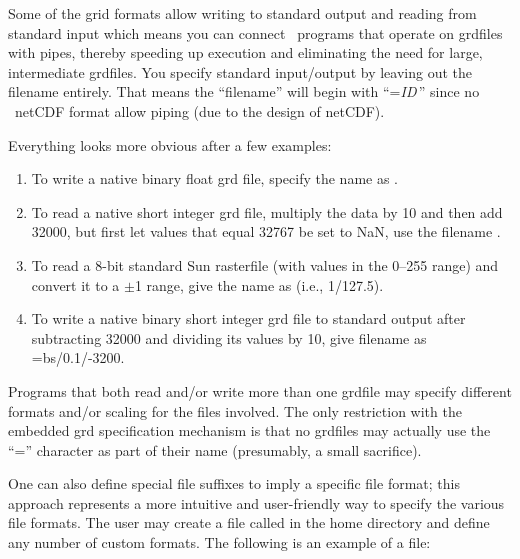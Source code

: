 Some of the grid formats allow writing to standard output and reading
from standard input which means you can connect \GMT\ programs that
operate on grdfiles with pipes, thereby speeding up execution and
eliminating the need for large, intermediate grdfiles.  You specify
standard input/output by leaving out the filename entirely.
That means the ``filename'' will begin with
``={\it ID}\,'' since no \GMT\  netCDF format 
allow piping (due to the design of netCDF). 

Everything looks more obvious after a few examples: 

\begin{enumerate}
\item To write a native binary float grd file, specify the name as .

\item To read a native short integer grd file, multiply the data by 10 and then
add 32000, but first let values that equal 32767 be set to NaN,
use the filename . 

\item To read a 8-bit standard Sun rasterfile (with values in the 0--255 range)
and convert it to a $\pm$1 range, give the name as
 (i.e., 1/127.5).

\item To write a native binary short integer grd file to standard output after subtracting
32000 and dividing its values by 10, give filename as =bs/0.1/-3200. 

\end{enumerate} 

Programs that both read and/or write more than one grdfile may
specify different formats and/or scaling for the files involved.
The only restriction with the embedded grd specification mechanism
is that no grdfiles may actually use the ``=''
character as part of their name (presumably, a small sacrifice). 


One can also define special file suffixes to imply a specific file
format; this approach represents a more intuitive and user-friendly
way to specify the various file formats.  The user may create a file
called  in the home directory and define any
number of custom formats.  The following is an example of a
 file:

\vspace{\baselineskip} 

